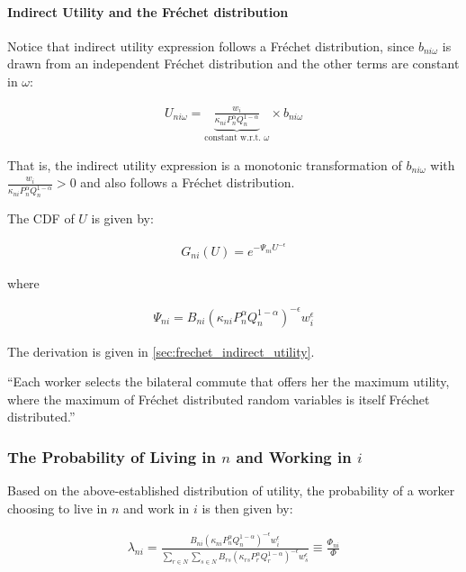 \documentclass[10pt]{article}
\begin{document}
\paragraph{Indirect Utility and the Fréchet distribution}

Notice that indirect utility expression follows a Fréchet distribution,
since $b_{n i \omega}$ is drawn from an independent Fréchet distribution
and the other terms are constant in $\omega$:

\begin{align}
    U_{n i \omega}=\underbrace{\frac{w_i}{\kappa_{n i} P_n^\alpha Q_n^{1-\alpha}}}_{\text {constant w.r.t. } \omega} \times b_{n i \omega}
\end{align}

That is, the indirect utility expression is a monotonic 
transformation of $b_{n i \omega}$ with $\frac{w_i}{\kappa_{n i} P_n^\alpha Q_n^{1-\alpha}} > 0$ and also 
follows a Fréchet distribution.

The CDF of $U$ is given by:

\begin{align}
    G_{n i}(U)=e^{-\Psi_{n i} U^{-\epsilon}} \label{eq:frechet_indirect_utility}
\end{align}

where 

\begin{align}
    \Psi_{n i}=B_{n i}\left(\kappa_{n i} P_n^\alpha Q_n^{1-\alpha}\right)^{-\epsilon} w_i^\epsilon
\end{align}

The derivation is given in \autoref{sec:frechet_indirect_utility}.

``Each worker selects the
bilateral commute that offers her the maximum utility, where the maximum of
Fréchet distributed random variables is itself Fréchet distributed.''

\subsubsection{The Probability of Living in $n$ and Working in $i$}

Based on the above-established distribution of utility, 
the probability of a worker choosing to live in $n$ 
and work in $i$ is then given by:

\begin{align}
    \lambda_{n i}=\frac{B_{n i}\left(\kappa_{n i} P_n^\alpha Q_n^{1-\alpha}\right)^{-\epsilon} w_i^\epsilon}{\sum_{r \in N} \sum_{s \in N} B_{r s}\left(\kappa_{r s} P_r^\alpha Q_r^{1-\alpha}\right)^{-\epsilon} w_s^\epsilon} \equiv \frac{\Phi_{n i}}{\Phi} \label{eq:lambda_ni_1}
\end{align}
\end{document}
